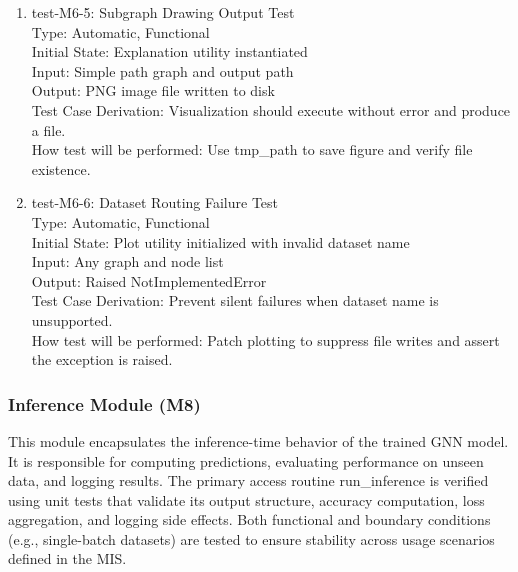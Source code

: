 \documentclass[12pt, titlepage]{article}
\begin{document}
\begin{enumerate}
\item{test-M6-5: Subgraph Drawing Output Test\\}
Type: Automatic, Functional \\
Initial State: Explanation utility instantiated \\
Input: Simple path graph and output path \\
Output: PNG image file written to disk \\
Test Case Derivation: Visualization should execute without error and produce a file. \\
How test will be performed: Use tmp\_path to save figure and verify file existence.

\item{test-M6-6: Dataset Routing Failure Test\\}
Type: Automatic, Functional \\
Initial State: Plot utility initialized with invalid dataset name \\
Input: Any graph and node list \\
Output: Raised NotImplementedError \\
Test Case Derivation: Prevent silent failures when dataset name is unsupported. \\
How test will be performed: Patch plotting to suppress file writes and assert the exception is raised.

\end{enumerate}


\subsubsection{Inference Module (M8)}

This module encapsulates the inference-time behavior of the trained GNN model. It is responsible for computing predictions, evaluating performance on unseen data, and logging results. The primary access routine run\_inference is verified using unit tests that validate its output structure, accuracy computation, loss aggregation, and logging side effects. Both functional and boundary conditions (e.g., single-batch datasets) are tested to ensure stability across usage scenarios defined in the MIS.
\end{document}
